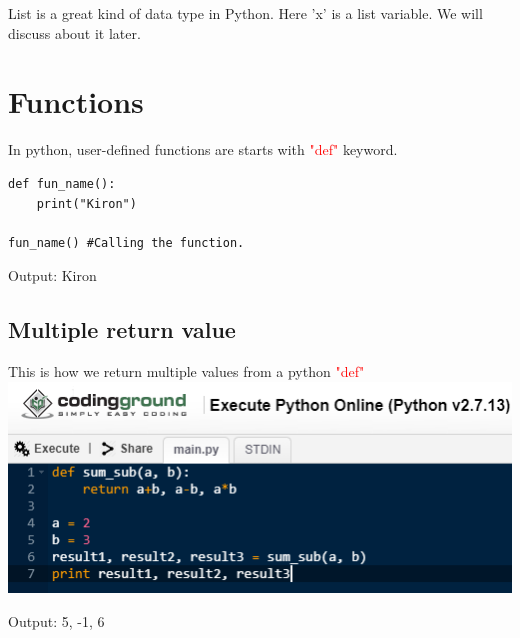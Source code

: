 \documentclass[11 pt, letterpaper]{article}
\begin{document}
List is a great kind of data type in Python. Here 'x' is a list variable. We will discuss about it later.

\section{Functions}
In python, user-defined functions are starts with \textcolor{red}{"def"} keyword.
\begin{lstlisting}
def fun_name():
	print("Kiron")
	
fun_name() #Calling the function.
\end{lstlisting}
\begin{tcolorbox}
Output: Kiron
\end{tcolorbox}

\subsection{Multiple return value}
This is how we return multiple values from a python \textcolor{red}{"def"}\\
\centering
\includegraphics[width=200 px]{Multiple return value from function def.png}
\begin{tcolorbox}
Output: 5, -1, 6
\end{tcolorbox}
\end{document}
